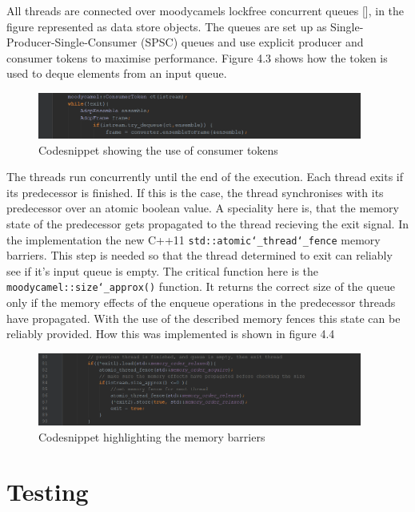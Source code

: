  All threads are connected over moodycamels lockfree concurrent queues [], in the figure represented as data store objects. The queues are set up as Single-Producer-Single-Consumer (SPSC) queues and use explicit producer and consumer tokens to maximise performance. Figure 4.3 shows how the token is used to deque elements from an input queue.\\
\begin{figure}[h]	
\centering
      \includegraphics[width=0.95\textwidth]{ct}
        \caption{Codesnippet showing the use of consumer tokens}
\end{figure}

The threads run concurrently until the end of the execution. Each thread exits if its predecessor is finished. If this is the case, the thread synchronises with its predecessor over an atomic boolean value. A speciality here is, that the memory state of the predecessor gets propagated to the thread recieving the exit signal. In the implementation the new C++11 \texttt{std::atomic\char`_thread\char`_fence} memory barriers. This step is needed so that the thread determined to exit can reliably see if it's input queue is empty. The critical function here is the \texttt{moodycamel::size\char`_approx()} function. It returns the correct size of the queue only if the memory effects of the enqueue operations in the predecessor threads have propagated. With the use of the described memory fences this state can be reliably provided. How this was implemented is shown in figure 4.4\\
\begin{figure}[h]
\centering
      \includegraphics[width=0.95\textwidth]{memory_barrier}
        \caption{Codesnippet highlighting the memory barriers}
\end{figure}





\chapter{Testing}


 